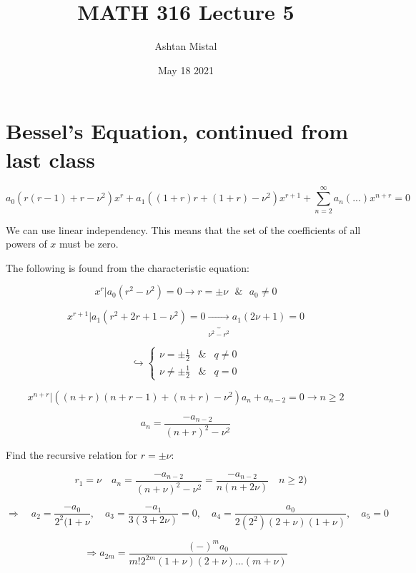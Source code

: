 \documentclass{article}
\title{MATH 316 Lecture 5}
\author{Ashtan Mistal}
\date{May 18 2021}
\begin{document}
\ifstandalone
\maketitle
\fi

\graphicspath{{./Lecture05/}}

\section{Bessel's Equation, continued from last class}

$$a_0 (r(r-1) + r - \nu^2) x^r + a_1 \left((1+r)r + (1+r) - \nu^2 \right) x^{r+1} + \sum_{n = 2}^\infty a_n \left(... \right) x^{n+r} = 0$$

We can use linear independency. This means that the set of the coefficients of all powers of $x$ must be zero.

The following is found from the characteristic equation:

$$x^r | a_0 (r^2 - \nu^2) = 0 \longrightarrow r = \pm \nu \text{ }\& \text{ } a_0 \neq 0$$

$$x^{r+1} | a_1 \left(r^2 + 2r + 1 - \nu^2 \right) = 0 \underbrace{\longrightarrow}_{\nu^2 - r^2} a_1 (2 \nu + 1) = 0$$

$$\hookrightarrow \left\{ \begin{matrix} \nu = \pm \frac{1}{2} &  \& & q \neq 0 \\ \nu \neq \pm \frac{1}{2} & \& & q = 0 \end{matrix} \right.$$

$$x^{n+r} | \left((n+r) (n+r-1) + (n+r) - \nu^2 \right) a_n + a_{n-2} = 0 \longrightarrow n \geq 2$$

\begin{equation}
\label{Recursive Relation}
     a_n = \frac{-a_{n-2}}{(n+r)^2 - \nu^2}
\end{equation}

Find the recursive relation for $r = \pm \nu$:

$$\quad r_1 = \nu \quad a_n = \frac{-a_{n-2}}{(n+\nu)^2 - \nu^2} = \frac{-a_{n-2}}{n(n + 2 \nu)} \quad n \geq 2)$$


$$\Rightarrow \quad a_2 = \frac{- a_0}{ 2^2 (1 + \nu}, \quad a_3 = \frac{- a_1}{3 (3 + 2 \nu)} = 0, \quad a_4 = \frac{a_0}{2(2^2)(2+\nu)(1 + \nu)}, \quad a_5 = 0$$


\hfill

$$\Rightarrow a_{2m} = \frac{(-)^m a_0}{m! 2^{2m} (1 + \nu) (2 + \nu) ... (m + \nu)}$$
\end{document}
